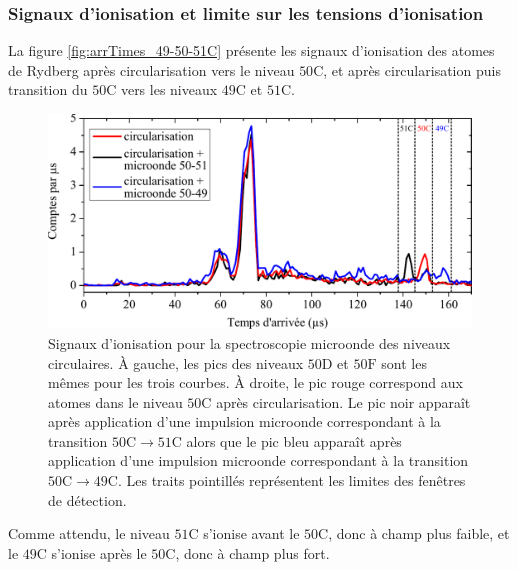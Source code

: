 	\subsubsection*{Signaux d'ionisation et limite sur les tensions d'ionisation}
\noindent La figure \eqref{fig:arrTimes_49-50-51C} présente les signaux d'ionisation des atomes de Rydberg après circularisation vers le niveau $\mathrm{50C}$, et après circularisation puis transition du $\mathrm{50C}$ vers les niveaux $\mathrm{49C}$ et $\mathrm{51C}$.

\begin{figure}[h]
\centering
\includegraphics[width=.85\linewidth]{figures/circulars/arrTimes_49-50-51C}
\caption[Signaux d'ionisation pour la spectroscopie microonde des niveaux circulaires]{
Signaux d'ionisation pour la spectroscopie microonde des niveaux circulaires.
À gauche, les pics des niveaux $\mathrm{50D}$ et $\mathrm{50F}$ sont les mêmes pour les trois courbes.
À droite, le pic rouge correspond aux atomes dans le niveau $\mathrm{50C}$ après circularisation.
Le pic noir apparaît après application d'une impulsion microonde correspondant à la transition $\mathrm{50C}\rightarrow \mathrm{51C}$ alors que le pic bleu apparaît après application d'une impulsion microonde correspondant à la transition $\mathrm{50C}\rightarrow \mathrm{49C}$.
Les traits pointillés représentent les limites des fenêtres de détection.
}
\label{fig:arrTimes_49-50-51C}
\end{figure}
%
Comme attendu, le niveau $\mathrm{51C}$ s'ionise avant le $\mathrm{50C}$, donc à champ plus faible, et le $\mathrm{49C}$ s'ionise après le $\mathrm{50C}$, donc à champ plus fort.

